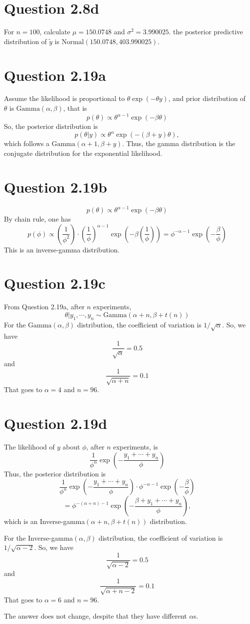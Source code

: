 \documentclass{article}
\begin{document}
\section*{Question 2.8d}
{
    For $n=100$, calculate $\mu = 150.0748$ and $\sigma^2 = 3.990025$. the posterior predictive distribution of $\widetilde{y}$ is $\mathrm{Normal}(150.0748, 403.990025)$.
}

\section*{Question 2.19a}
{
    Assume the likelihood is proportional to $\theta \exp{(-\theta y)}$, and prior distribution of $\theta$ is $\mathrm{Gamma}(\alpha, \beta)$, that is
    $$p(\theta) \propto \theta^{\alpha-1} \exp{(-\beta \theta)}$$
    So, the posterior distribution is
    $$p(\theta | y) \propto \theta^{\alpha} \exp{(-(\beta + y) \theta)},$$
    which follows a $\mathrm{Gamma}(\alpha+1, \beta+y)$. Thus, the gamma distribution is the conjugate distribution for the exponential likelihood.
}

\section*{Question 2.19b}
{
    $$p(\theta) \propto \theta^{\alpha-1} \exp{(-\beta \theta)}$$
    By chain rule, one has
    $$p(\phi) \propto (\frac{1}{\phi^2}) \cdot (\frac{1}{\phi})^{\alpha-1} \exp{(-\beta (\frac{1}{\phi}))} = \phi^{-\alpha-1} \exp{(-\frac{\beta}{\phi})}$$
    This is an inverse-gamma distribution.
}

\section*{Question 2.19c}
{
    From Question 2.19a, after $n$ experiments, $$\theta|y_1,\cdots,y_n \sim \mathrm{Gamma}(\alpha+n, \beta+t(n))$$
    For the $\mathrm{Gamma}(\alpha, \beta)$ distribution, the coefficient of variation is $1/\sqrt{\alpha}$. So, we have
    $$\frac{1}{\sqrt{\alpha}} = 0.5$$ and $$\frac{1}{\sqrt{\alpha+n}} = 0.1$$
    That goes to $\alpha = 4$ and $n=96$.
}

\section*{Question 2.19d}
{
    The likelihood of $y$ about $\phi$, after $n$ experiments, is $$\frac{1}{\phi^n} \exp{(-\frac{y_1 + \cdots + y_n}{\phi})}$$
    Thus, the posterior distribution is $$\frac{1}{\phi^n} \exp{(-\frac{y_1 + \cdots + y_n}{\phi})} \cdot \phi^{-\alpha-1} \exp{(-\frac{\beta}{\phi})}$$
    $$= \phi^{-(\alpha+n)-1} \exp{(-\frac{\beta + y_1 + \cdots + y_n}{\phi})},$$
    which is an Inverse-gamma$(\alpha+n, \beta+t(n))$ distribution.

    For the Inverse-gamma$(\alpha, \beta)$ distribution, the coefficient of variation is $1/\sqrt{\alpha-2}$. So, we have
    $$\frac{1}{\sqrt{\alpha-2}} = 0.5$$ and $$\frac{1}{\sqrt{\alpha+n-2}} = 0.1$$
    That goes to $\alpha = 6$ and $n=96$.

    The answer does not change, despite that they have different $\alpha$s.
}
\end{document}
